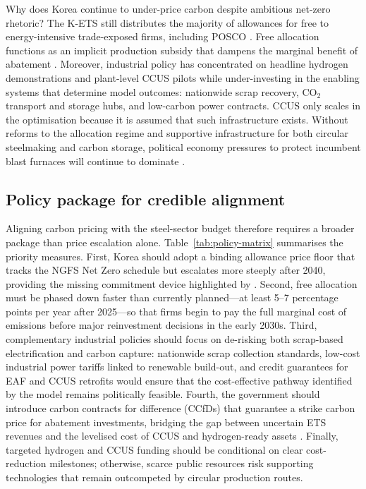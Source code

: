 \documentclass[preprint,1p,authoryear]{elsarticle}
\begin{document}
Why does Korea continue to under-price carbon despite ambitious net-zero rhetoric? The K-ETS still distributes the majority of allowances for free to energy-intensive trade-exposed firms, including POSCO \citep{kim2021kets, ICAP2024}. Free allocation functions as an implicit production subsidy that dampens the marginal benefit of abatement \citep{sartor2012benchmark}. Moreover, industrial policy has concentrated on headline hydrogen demonstrations and plant-level CCUS pilots while under-investing in the enabling systems that determine model outcomes: nationwide scrap recovery, CO$_2$ transport and storage hubs, and low-carbon power contracts. CCUS only scales in the optimisation because it is assumed that such infrastructure exists. Without reforms to the allocation regime and supportive infrastructure for both circular steelmaking and carbon storage, political economy pressures to protect incumbent blast furnaces will continue to dominate \citep{MaterialEconomics2019}.

\subsection{Policy package for credible alignment}

Aligning carbon pricing with the steel-sector budget therefore requires a broader package than price escalation alone. Table~\ref{tab:policy-matrix} summarises the priority measures. First, Korea should adopt a binding allowance price floor that tracks the NGFS Net Zero schedule but escalates more steeply after 2040, providing the missing commitment device highlighted by \citet{fowlie2016carbon}. Second, free allocation must be phased down faster than currently planned—at least 5--7 percentage points per year after 2025—so that firms begin to pay the full marginal cost of emissions before major reinvestment decisions in the early 2030s. Third, complementary industrial policies should focus on de-risking both scrap-based electrification and carbon capture: nationwide scrap collection standards, low-cost industrial power tariffs linked to renewable build-out, and credit guarantees for EAF and CCUS retrofits would ensure that the cost-effective pathway identified by the model remains politically feasible. Fourth, the government should introduce carbon contracts for difference (CCfDs) that guarantee a strike carbon price for abatement investments, bridging the gap between uncertain ETS revenues and the levelised cost of CCUS and hydrogen-ready assets \citep{Neuhoff2019CCfD,Richstein2017CCfD}. Finally, targeted hydrogen and CCUS funding should be conditional on clear cost-reduction milestones; otherwise, scarce public resources risk supporting technologies that remain outcompeted by circular production routes.
\end{document}
